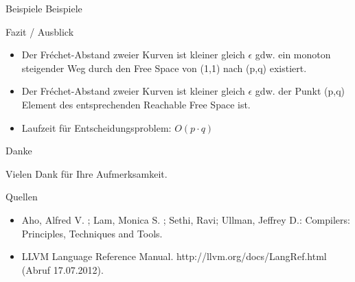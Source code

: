 \documentclass[ucs,9pt]{beamer}
\begin{document}
\begin{frame}{Beispiele}
Beispiele
\end{frame}

\begin{frame}{Fazit / Ausblick}
\begin{itemize}
\item Der Fréchet-Abstand zweier Kurven ist kleiner gleich $\epsilon$ gdw. ein monoton steigender Weg durch den Free Space von (1,1) nach (p,q) existiert.
\vspace{3mm}
\item Der Fréchet-Abstand zweier Kurven ist kleiner gleich $\epsilon$ gdw. der Punkt (p,q) Element des entsprechenden Reachable Free Space ist.
\vspace{3mm}
\item Laufzeit für Entscheidungsproblem: $O(p\cdot q)$
\end{itemize}
\end{frame}

\begin{frame}{Danke}
	\begin{center}
		\begin{Large}Vielen Dank für Ihre Aufmerksamkeit.\end{Large}
	\end{center}
\end{frame}


\begin{frame}{Quellen}
	\begin{itemize}
		\item Aho, Alfred V. ; Lam, Monica S. ; Sethi, Ravi; Ullman, Jeffrey D.: Compilers: Principles, Techniques and Tools.
		\vspace{2mm}
		\item LLVM Language Reference Manual. http://llvm.org/docs/LangRef.html (Abruf 17.07.2012).
	\end{itemize}
\end{frame}
\end{document}
